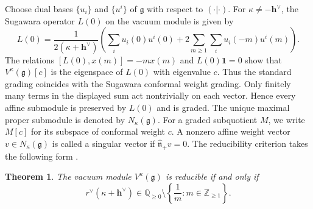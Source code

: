 \documentclass[11pt,a4paper]{amsart}
\newcommand{\ZZ}{\mathbb Z}
\theoremstyle{plain}
\newtheorem{theorem}{Theorem}[section]
\numberwithin{equation}{section}
\def\geq{\geqslant}
\begin{document}
Choose dual bases \(\{u_i\}\) and \(\{u^i\}\) of \(\mathfrak g\)
with respect to \((\cdot|\cdot)\). For \(\kappa\ne-\mathbf{h}^\vee\), the Sugawara operator \(L(0)\) on the
vacuum module is given by
\[
L(0)
=\frac{1}{2(\kappa+\mathbf{h}^\vee)}
\left(
\sum_i u_i(0)u^i(0)
+2\sum_{m\geq1}\sum_i u_i(-m)u^i(m)
\right).
\]
The relations \([L(0),x(m)]=-m x(m)\) and \(L(0)\mathbf1=0\)
show that \(V^\kappa(\mathfrak g)[c]\) is the eigenspace of
\(L(0)\) with eigenvalue \(c\). Thus the standard grading
coincides with the Sugawara conformal weight grading.
Only finitely many terms in the displayed sum act nontrivially
on each vector. Hence every affine submodule is preserved by
\(L(0)\) and is graded.
The unique maximal proper submodule is denoted by \(N_\kappa(\mathfrak g)\).
For a graded subquotient \(M\), we write \(M[c]\) for its
subspace of conformal weight \(c\).
A nonzero affine weight vector \(v\in N_\kappa(\mathfrak g)\)
is called a singular vector if \(\widehat{\mathfrak n}_+v=0\).
The reducibility criterion takes the following form \cite{GK07}.

\begin{theorem}
\label{nonsimple}
The vacuum module \(V^\kappa(\mathfrak g)\) is reducible
if and only if
\[
r^\vee(\kappa+\mathbf{h}^\vee)
\in\mathbb Q_{\geq0}
\setminus\left\{\frac1m:m\in\ZZ_{\geq1}\right\}.
\]
\end{theorem}
\end{document}
